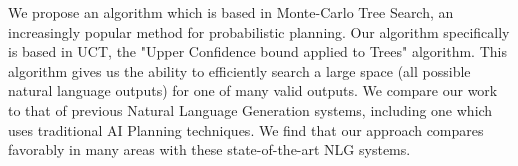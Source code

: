 We propose an algorithm which is based in Monte-Carlo Tree Search, an increasingly
popular method for probabilistic planning.  Our algorithm specifically is based in
UCT, the "Upper Confidence bound applied to Trees" algorithm.  This algorithm gives
us the ability to efficiently search a large space (all possible natural language outputs) for 
one of many valid outputs.  We compare our work to that of previous Natural Language
Generation systems, including one which uses traditional AI Planning techniques.
We find that our approach compares favorably in many areas with these state-of-the-art
NLG systems.\\